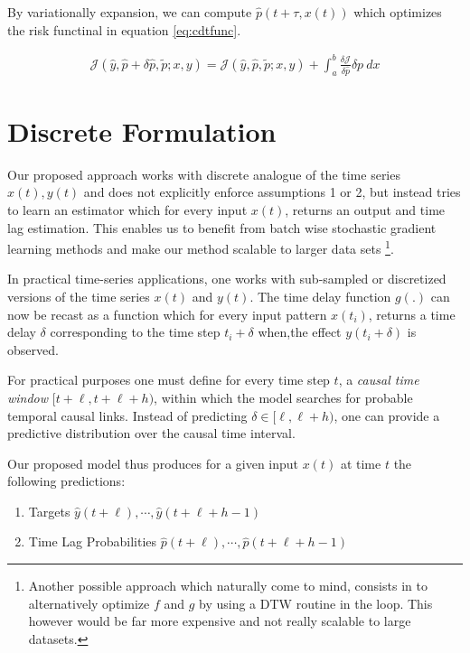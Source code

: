 \documentclass[runningheads]{llncs}
\begin{document}
By variationally expansion, we can compute $\hat{p}(t + \tau, x(t))$ which optimizes the risk functinal in 
equation \ref{eq:cdtfunc}.

\begin{align}
      \mathcal{J}(\hat{y}, \hat{p} + \delta \hat{p}, \tilde{p}; x, y) = 
      \mathcal{J}(\hat{y}, \hat{p}, \tilde{p}; x, y) + 
      \int_a^b \frac{\delta \mathcal{J}}{\delta \hat{p}} {\delta p} \ dx
\end{align}


\section{Discrete Formulation}

Our proposed approach works with discrete analogue of the time series $x(t), y(t)$ 
and does not explicitly enforce assumptions 1 or 2, but instead tries to learn an 
estimator which for every input $x(t)$, returns an output and time lag estimation. 
This enables us to benefit from batch wise stochastic gradient learning methods and 
make our method scalable to larger data sets \footnote{Another possible approach which 
naturally come to mind, consists in to alternatively optimize $f$ and $g$ by using a 
DTW routine in the loop. This however would be far more expensive and not 
really scalable to large datasets.}.

In practical time-series applications, one works with sub-sampled or discretized versions of the time 
series $x(t)$ and $y(t)$. The time delay function $g(.)$ can now be recast as a function which for 
every input pattern $x(t_i)$, returns a time delay $\delta$ corresponding to the time step 
$t_i + \delta$ when,the effect $y(t_i + \delta)$ is observed.

For practical purposes one must define for every time step $t$, a \emph{causal time window} 
$[t+\ell, t+\ell+h)$, within which the model searches for probable temporal causal links. 
Instead of predicting $\delta \in [\ell, \ell+h)$, one can provide a predictive distribution 
over the causal time interval.

Our proposed model thus produces for a given input $x(t)$ at time $t$ the following predictions:

\begin{enumerate}
\item Targets $\hat{y}(t+\ell), \cdots, \hat{y}(t+\ell+h-1)$
\item Time Lag Probabilities $\hat{p}(t+\ell), \cdots, \hat{p}(t+\ell+h-1)$
\end{enumerate}
\end{document}
